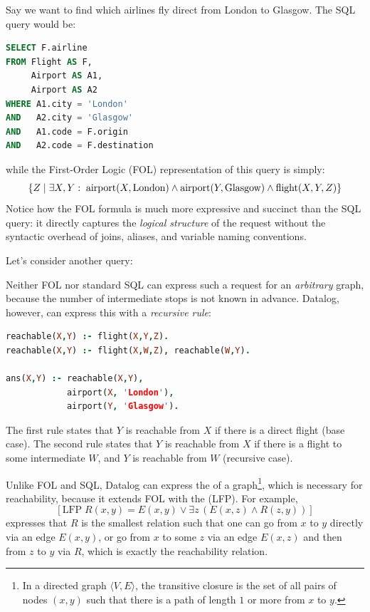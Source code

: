 \vspace{3mm}
Say we want to find which airlines fly direct from London to Glasgow.
The SQL query would be:
\begin{lstlisting}[language=sql]
SELECT F.airline
FROM Flight AS F,
     Airport AS A1,
     Airport AS A2
WHERE A1.city = 'London'
AND   A2.city = 'Glasgow'
AND   A1.code = F.origin
AND   A2.code = F.destination
\end{lstlisting}
while the First-Order Logic (FOL) representation of this query is simply:
\[
    \set{Z \mid \exists X,Y:\; \text{airport}(X,\text{London}) \land \text{airport}(Y,\text{Glasgow}) \land \text{flight}(X,Y,Z)}
\]
Notice how the FOL formula is much more expressive and succinct than the SQL query: it directly captures the \emph{logical structure} of the request without the syntactic overhead of joins, aliases, and variable naming conventions.

Let's consider another query: 

Neither FOL nor standard SQL can express such a request for an \emph{arbitrary} graph, because the number of intermediate stops is not known in advance. Datalog, however, can express this with a \emph{recursive rule}:
\begin{lstlisting}[language=prolog]
reachable(X,Y) :- flight(X,Y,Z).
reachable(X,Y) :- flight(X,W,Z), reachable(W,Y).

ans(X,Y) :- reachable(X,Y), 
            airport(X, 'London'), 
            airport(Y, 'Glasgow').
\end{lstlisting}

The first rule states that \(Y\) is reachable from \(X\) if there is a direct flight (base case). The second rule states that \(Y\) is reachable from \(X\) if there is a flight to some intermediate \(W\), and \(Y\) is reachable from \(W\) (recursive case).

Unlike FOL and SQL, Datalog can express the  of a graph\footnote{In a directed graph \(\langle V,E\rangle\), the transitive closure is the set of all pairs of nodes \((x,y)\) such that there is a path of length \(1\) or more from \(x\) to \(y\).}, which is necessary for reachability, because it extends FOL with the  (LFP). For example,
\[
[\text{LFP}\; R(x,y) = E(x,y) \lor \exists z\, (E(x,z) \land R(z,y))]
\]
expresses that \(R\) is the smallest relation such that one can go from \(x\) to \(y\) directly via an edge \(E(x,y)\), or go from \(x\) to some \(z\) via an edge \(E(x,z)\) and then from \(z\) to \(y\) via \(R\), which is exactly the reachability relation.

